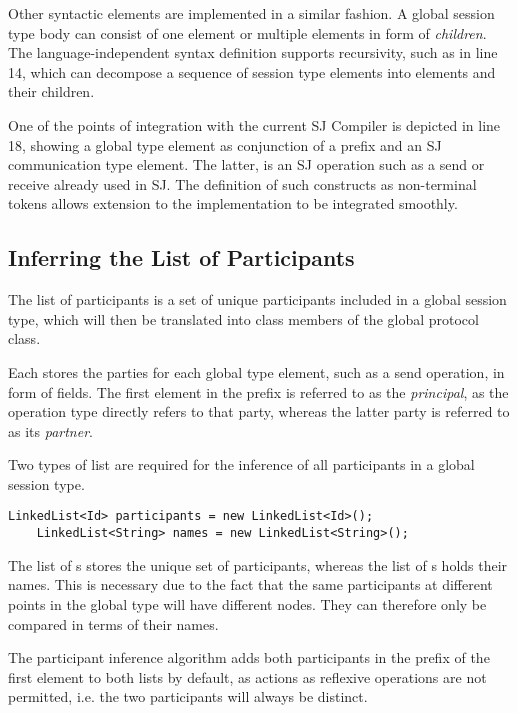 Other syntactic elements are implemented in a similar fashion. A global session type body can consist of one element or multiple elements in form of \textit{children}. The language-independent syntax definition supports recursivity, such as in line 14, which can decompose a sequence of session type elements into elements and their children.

One of the points of integration with the current SJ Compiler is depicted in line 18, showing a global type element as conjunction of a prefix and an SJ communication type element. The latter, is an SJ operation such as a send or receive already used in SJ. The definition of such constructs as non-terminal tokens allows extension to the implementation to be integrated smoothly.  


\subsection{Inferring the List of Participants}
\label{subsec:inference}

The list of participants is a set of unique participants included in a global session type, which will then be translated into class members of the global protocol class. 

Each  stores the parties for each global type element, such as a send operation, in form of  fields. The first element in the prefix is referred to as the \textit{principal}, as the operation type directly refers to that party, whereas the latter party is referred to as its \textit{partner}.

Two types of list are required for the inference of all participants in a global session type. 

\begin{lstlisting}[basicstyle=\LISTINGSTYLE]
	LinkedList<Id> participants = new LinkedList<Id>();
	LinkedList<String> names = new LinkedList<String>();
\end{lstlisting}

The list of s stores the unique set of participants, whereas the list of s holds their names. This is necessary due to the fact that the same participants at different points in the global type will have different  nodes. They can therefore only be compared in terms of their names.

The participant inference algorithm adds both participants in the prefix of the first element to both lists by default, as actions as reflexive operations are not permitted, i.e. the two participants will always be distinct. 


